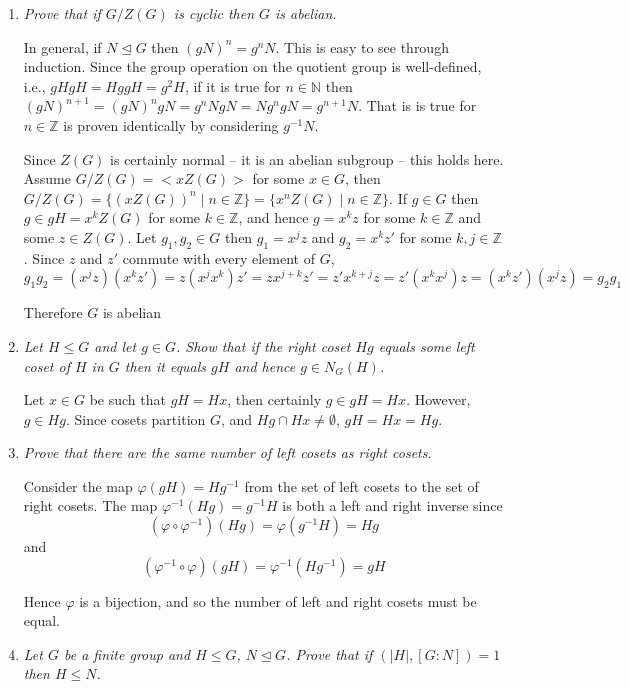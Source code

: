 \documentclass[letterpaper, 11pt]{article}
\begin{document}
\begin{enumerate}
\item \emph{Prove that if $G/Z(G)$ is cyclic then $G$ is abelian.}

In general, if $N \unlhd G$ then $(gN)^n = g^nN$.  This is easy to see through induction.  Since the group operation on the quotient group is well-defined, i.e., $gHgH = HggH = g^2H$, if it is true for $n \in \mathbb{N}$ then $(gN)^{n+1} = (gN)^ngN = g^nNgN = Ng^ngN = g^{n+1}N$.  That is is true for $n \in \mathbb{Z}$ is proven identically by considering $g^{-1}N$.

Since $Z(G)$ is certainly normal -- it is an abelian subgroup -- this holds here.  Assume $G/Z(G) = <xZ(G)>$ for some $x \in G$, then $G/Z(G) = \{(xZ(G))^n \mid n \in \mathbb{Z}\} = \{x^nZ(G) \mid n \in \mathbb{Z}\}$.  If $g \in G$ then $g \in gH = x^kZ(G)$ for some $k \in \mathbb{Z}$, and hence $g = x^kz$ for some $k \in \mathbb{Z}$ and some $z \in Z(G)$.  Let $g_1, g_2 \in G$ then $g_1 = x^jz$ and $g_2 = x^kz'$ for some $k,j \in \mathbb{Z}$.  Since $z$ and $z'$ commute with every element of $G$,
\[
g_1g_2 = (x^jz)(x^kz') = z(x^jx^k)z' = zx^{j+k}z' = z'x^{k+j}z = z'(x^kx^j)z = (x^kz')(x^jz) = g_2g_1
\]

Therefore $G$ is abelian


\item \emph{Let $H \leq G$ and let $g \in G$.  Show that if the right coset $Hg$ equals some left coset of $H$ in $G$ then it equals $gH$ and hence $g \in N_G(H)$.}

Let $x \in G$ be such that $gH = Hx$, then certainly $g \in gH = Hx$.  However, $g \in Hg$.  Since cosets partition $G$, and $Hg \cap Hx \neq \emptyset$, $gH = Hx = Hg$.

\item \emph{Prove that there are the same number of left cosets as right cosets.}

Consider the map $\varphi(gH) = Hg^{-1}$ from the set of left cosets to the set of right cosets.  The map $\varphi^{-1}(Hg) = g^{-1}H$ is both a left and right inverse since
\[
\left(\varphi \circ \varphi^{-1}\right)(Hg) =  \varphi(g^{-1}H) = Hg
\]
and
\[
\left(\varphi^{-1} \circ \varphi\right)(gH) = \varphi^{-1}(Hg^{-1}) = gH
\]

Hence $\varphi$ is a bijection, and so the number of left and right cosets must be equal.

\item \emph{Let $G$ be a finite group and $H \leq G$, $N \unlhd G$.  Prove that if $(|H|, [G: N]) = 1$ then $H \leq N$.}


\end{enumerate}
\end{document}
